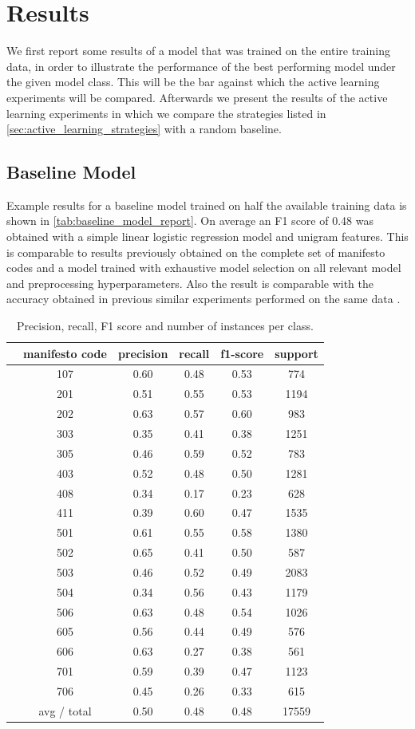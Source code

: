 \documentclass[runningheads,a4paper]{article}
\begin{document}
\section{Results}\label{sec:results}

We first report some results of a model that was trained on the entire training data, in order to illustrate the performance of the best performing model under the given model class. This will be the bar against which the active learning experiments will be compared. Afterwards we present the results of the active learning experiments in which we compare the strategies listed in \autoref{sec:active_learning_strategies} with a random baseline. 

\subsection{Baseline Model}\label{sec:results_baseline}
Example results for a baseline model trained on half the available training data is shown in \autoref{tab:baseline_model_report}. On average an F1 score of 0.48 was obtained with a simple linear logistic regression model and unigram features. This is comparable to results previously obtained on the complete set of manifesto codes and a model trained with exhaustive model selection on all relevant model and preprocessing hyperparameters. Also the result is comparable with the accuracy obtained in previous similar experiments performed on the same data \cite{Merz2016}.
\begin{table}
\centering
\begin{tabular}{cccccc}
\toprule
&  manifesto code & precision  &  recall&  f1-score &  support\\
\midrule
&   107&  0.60& 0.48& 0.53&  774\\
&   201&  0.51& 0.55& 0.53& 1194\\
&   202&  0.63& 0.57& 0.60&  983\\
&   303&  0.35& 0.41& 0.38& 1251\\
&   305&  0.46& 0.59& 0.52&  783\\
&   403&  0.52& 0.48& 0.50& 1281\\
&   408&  0.34& 0.17& 0.23&  628\\
&   411&  0.39& 0.60& 0.47& 1535\\
&   501&  0.61& 0.55& 0.58& 1380\\
&   502&  0.65& 0.41& 0.50&  587\\
&   503&  0.46& 0.52& 0.49& 2083\\
&   504&  0.34& 0.56& 0.43& 1179\\
&   506&  0.63& 0.48& 0.54& 1026\\
&   605&  0.56& 0.44& 0.49&  576\\
&   606&  0.63& 0.27& 0.38&  561\\
&   701&  0.59& 0.39& 0.47& 1123\\
&   706&  0.45& 0.26& 0.33&  615\\
\bottomrule
& avg / total&  0.50& 0.48& 0.48&17559\\
\end{tabular}
\caption{Precision, recall, F1 score and number of instances per class. }
\label{tab:baseline_model_report} 
\end{table}
\end{document}
